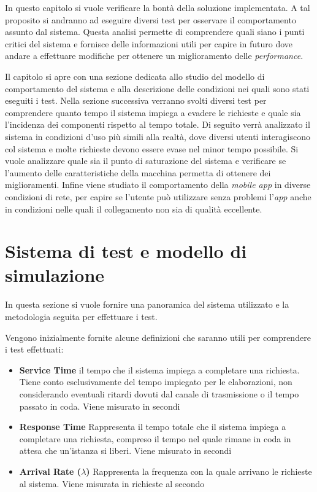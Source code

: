 In questo capitolo si vuole verificare la bontà della soluzione implementata. A tal proposito si andranno ad eseguire diversi test per osservare il comportamento assunto dal sistema. Questa analisi permette di comprendere quali siano i punti critici del sistema e fornisce delle informazioni utili per capire in futuro dove andare a effettuare modifiche per ottenere un miglioramento delle \emph{performance}.

Il capitolo si apre con una sezione dedicata allo studio del modello di comportamento del sistema e alla descrizione delle condizioni nei quali sono stati eseguiti i test. Nella sezione successiva verranno svolti diversi test per comprendere quanto tempo il sistema impiega a evadere le richieste e quale sia l'incidenza dei componenti rispetto al tempo totale. Di seguito verrà analizzato il sistema in condizioni d'uso più simili alla realtà, dove diversi utenti interagiscono col sistema e molte richieste devono essere evase nel minor tempo possibile. Si vuole analizzare quale sia il punto di saturazione del sistema e verificare se l'aumento delle caratteristiche della macchina permetta di ottenere dei miglioramenti. Infine viene studiato il comportamento della \emph{mobile app} in diverse condizioni di rete, per capire se l'utente può utilizzare senza problemi l'\emph{app} anche in condizioni nelle quali il collegamento non sia di qualità eccellente.

\section{Sistema di test e modello di simulazione\label{sec:sistema-e-modello}}

In questa sezione si vuole fornire una panoramica del sistema utilizzato e la metodologia seguita per effettuare i test.

Vengono inizialmente fornite alcune definizioni che saranno utili per comprendere i test effettuati:

\begin{itemize}
	\item \textbf{Service Time}
	\upe il tempo che il sistema impiega a completare una richiesta. Tiene conto esclusivamente del tempo impiegato per le elaborazioni, non considerando eventuali ritardi dovuti dal canale di trasmissione o il tempo passato in coda. Viene misurato in secondi
	\item \textbf{Response Time}
	Rappresenta il tempo totale che il sistema impiega a completare una richiesta, compreso il tempo nel quale rimane in coda in attesa che un'istanza si liberi. Viene misurato in secondi
	\item \textbf{Arrival Rate ($ \lambda $)}
	Rappresenta la frequenza con la quale arrivano le richieste al sistema. Viene misurata in richieste al secondo
\end{itemize}

